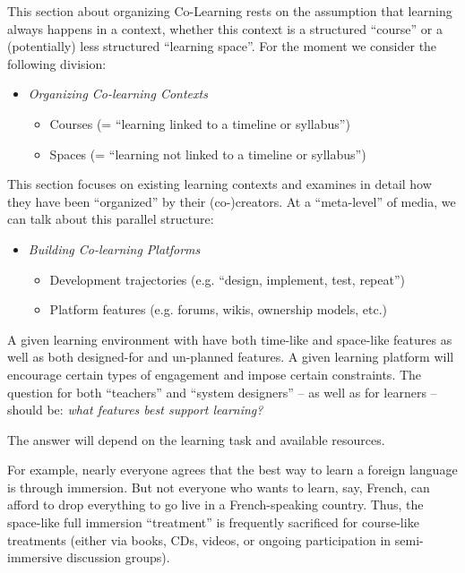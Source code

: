 This section about organizing Co-Learning rests on the assumption that
learning always happens in a context, whether this context is a
structured ``course'' or a (potentially) less structured ``learning
space''. For the moment we consider the following division:

\begin{itemize}
\item
  \emph{Organizing Co-learning Contexts}
  \begin{itemize}
  \item
    Courses (= ``learning linked to a timeline or syllabus'')
  \item
    Spaces (= ``learning not linked to a timeline or syllabus'')
  \end{itemize}
\end{itemize}
This section focuses on existing learning contexts and examines in
detail how they have been ``organized'' by their (co-)creators. At a
``meta-level'' of media, we can talk about this parallel structure:

\begin{itemize}
\item
  \emph{Building Co-learning Platforms}
  \begin{itemize}
  \item
    Development trajectories (e.g. ``design, implement, test, repeat'')
  \item
    Platform features (e.g. forums, wikis, ownership models, etc.)
  \end{itemize}
\end{itemize}
A given learning environment with have both time-like and space-like
features as well as both designed-for and un-planned features. A given
learning platform will encourage certain types of engagement and impose
certain constraints. The question for both ``teachers'' and ``system
designers'' -- as well as for learners -- should be: \emph{what features
best support learning?}

The answer will depend on the learning task and available resources.

For example, nearly everyone agrees that the best way to learn a foreign
language is through immersion. But not everyone who wants to learn, say,
French, can afford to drop everything to go live in a French-speaking
country. Thus, the space-like full immersion ``treatment'' is frequently
sacrificed for course-like treatments (either via books, CDs, videos, or
ongoing participation in semi-immersive discussion groups).

